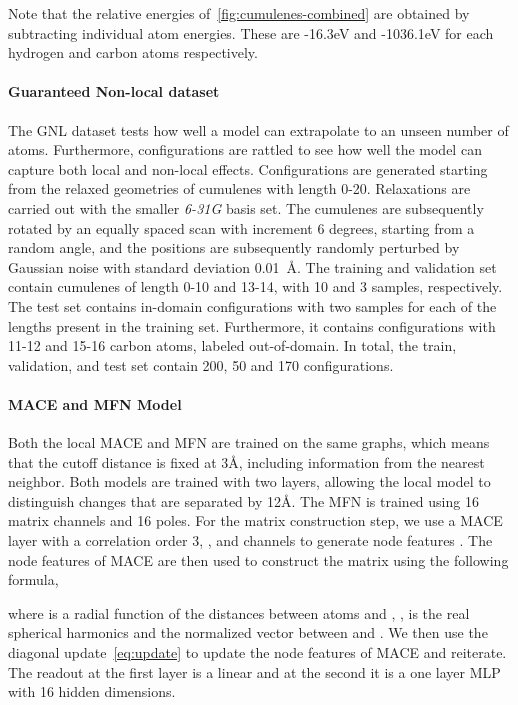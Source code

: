 \documentclass{article} \usepackage{iclr2024_conference,times}
\begin{document}
Note that the relative energies of~\ref{fig:cumulenes-combined} are obtained by subtracting individual atom energies. These are -16.3eV and -1036.1eV for each hydrogen and carbon atoms respectively.


\paragraph{Guaranteed Non-local dataset}

The GNL dataset tests how well a model can extrapolate to an unseen number of atoms. Furthermore, configurations are rattled to see how well the model can capture both local and non-local effects. Configurations are generated starting from the relaxed geometries of cumulenes with length 0-20. Relaxations are carried out with the smaller \textit{6-31G} basis set. The cumulenes are subsequently rotated by an equally spaced scan with increment 6 degrees, starting from a random angle, and the positions are subsequently randomly perturbed by Gaussian noise with standard deviation 0.01~\AA{}. The training and validation set contain cumulenes of length 0-10 and 13-14, with 10 and 3 samples, respectively. The test set contains in-domain configurations with two samples for each of the lengths present in the training set. Furthermore, it contains configurations with 11-12 and 15-16 carbon atoms, labeled out-of-domain. In total, the train, validation, and test set contain 200, 50 and 170 configurations.  


\paragraph{MACE and MFN Model}
Both the local MACE and MFN are trained on the same graphs, which means that the cutoff distance is fixed at 3\AA{}, including information from the nearest neighbor. Both models are trained with two layers, allowing the local model to distinguish changes that are separated by 12\AA{}. The MFN is trained using 16 matrix channels and 16 poles. For the matrix construction step, we use a MACE~\cite{Batatia2022mace} layer with a correlation order 3, ,  and  channels to generate node features . The node features of MACE are then used to construct the matrix using the following formula,

where  is a radial function of the distances between atoms  and , ,  is the real spherical harmonics and  the normalized vector between  and . We then use the diagonal update~\ref{eq:update} to update the node features of MACE and reiterate. The readout at the first layer is a linear and at the second it is a one layer MLP with 16 hidden dimensions.
\end{document}
